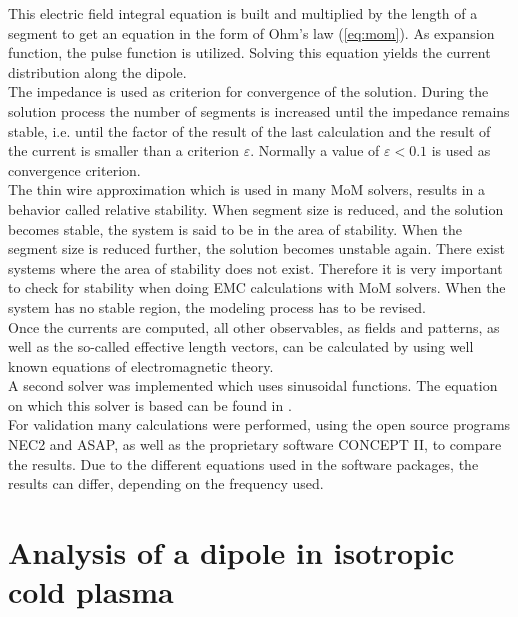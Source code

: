 \documentclass[two-column,ras]{agutex}
\begin{document}
\begin{article}
This electric field integral equation is built and multiplied by the length of a segment to get an equation in the form of Ohm's law (\ref{eq:mom}). As expansion function, the pulse function is utilized. Solving this equation yields the current distribution along the dipole.\\

The impedance is used as criterion for convergence of the solution. During the solution process the number of segments is increased until the impedance remains stable, i.e. until the factor of the result of the last calculation and the result of the current is smaller than a criterion $\varepsilon$. Normally a value of $\varepsilon < 0.1$ is used as convergence criterion.\\

 The thin wire approximation which is used in many MoM solvers, results in a behavior called relative stability. When segment size is reduced, and the solution becomes stable, the system is said to be in the area of stability. When the segment size is reduced further, the solution becomes unstable again. There exist systems where the area of stability does not exist. Therefore it is very important to check for stability when doing EMC calculations with MoM solvers. When the system has no stable region, the modeling process has to be revised.\\

Once the currents are computed, all other observables, as fields and patterns, as well as the so-called effective length vectors, can be calculated by using well known equations of electromagnetic theory.\\

A second solver was implemented which uses sinusoidal functions. The equation on which this solver is based can be found in \cite{davidson}.\\

For validation many calculations were performed, using the open source programs NEC2 and ASAP, as well as the proprietary software CONCEPT II, to compare the results. Due to the different equations used in the software packages, the results can differ, depending on the frequency used.\\
\section{Analysis of a dipole in isotropic cold plasma}

\end{article}
\end{document}
